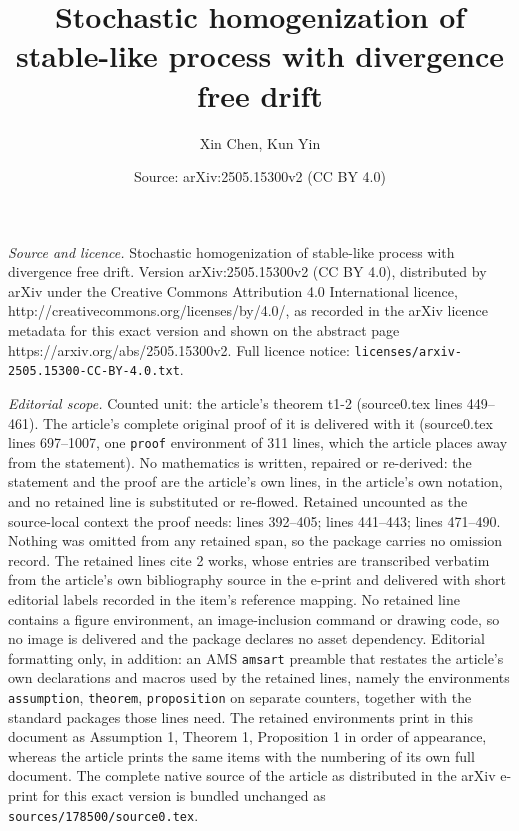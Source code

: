 \documentclass[10pt,a4paper]{amsart}
\title{Stochastic homogenization of stable-like process with divergence free drift}
\author{Xin Chen, Kun Yin}
\date{Source: arXiv:2505.15300v2 (CC BY 4.0)}
\begin{document}
\maketitle

\noindent\emph{Source and licence.} Stochastic homogenization of stable-like process with divergence free drift. Version arXiv:2505.15300v2 (CC BY 4.0), distributed by arXiv under the Creative Commons Attribution 4.0 International licence, http://creativecommons.org/licenses/by/4.0/, as recorded in the arXiv licence metadata for this exact version and shown on the abstract page https://arxiv.org/abs/2505.15300v2. Full licence notice: \texttt{licenses/arxiv-2505.15300-CC-BY-4.0.txt}.\par\smallskip

\noindent\textit{Editorial scope.} Counted unit: the article's theorem t1-2 (source0.tex lines 449--461). The article's complete original proof of it is delivered with it (source0.tex lines 697--1007, one \texttt{proof} environment of 311 lines, which the article places away from the statement). No mathematics is written, repaired or re-derived: the statement and the proof are the article's own lines, in the article's own notation, and no retained line is substituted or re-flowed.  Retained uncounted as the source-local context the proof needs: lines 392--405; lines 441--443; lines 471--490.  Nothing was omitted from any retained span, so the package carries no omission record.  The retained lines cite 2 works, whose entries are transcribed verbatim from the article's own bibliography source in the e-print and delivered with short editorial labels recorded in the item's reference mapping.  No retained line contains a figure environment, an image-inclusion command or drawing code, so no image is delivered and the package declares no asset dependency.  Editorial formatting only, in addition: an AMS \texttt{amsart} preamble that restates the article's own declarations and macros used by the retained lines, namely the environments \texttt{assumption}, \texttt{theorem}, \texttt{proposition} on separate counters, together with the standard packages those lines need.  The retained environments print in this document as Assumption 1, Theorem 1, Proposition 1 in order of appearance, whereas the article prints the same items with the numbering of its own full document.  The complete native source of the article as distributed in the arXiv e-print for this exact version is bundled unchanged as \texttt{sources/178500/source0.tex}.
\end{document}
